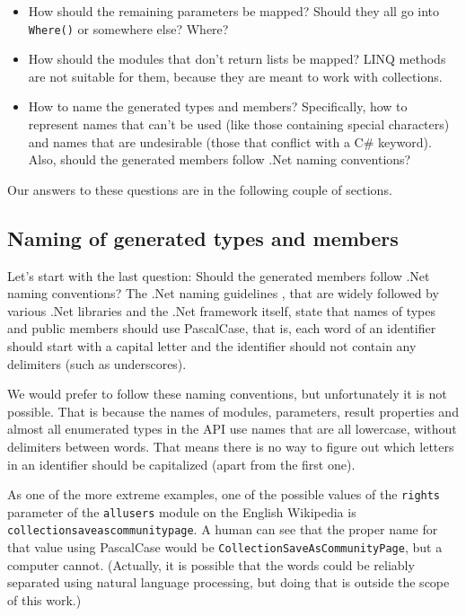 \begin{itemize}
\item How should the remaining parameters be mapped?
Should they all go into \lstinline{Where()} or somewhere else? Where?
\item How should the modules that don't return lists be mapped?
LINQ methods are not suitable for them, because they are meant to work with collections.
\item How to name the generated types and members?
Specifically, how to represent names that can't be used (like those containing special characters)
and names that are undesirable (those that conflict with a C\# keyword).
Also, should the generated members follow .Net naming conventions?
\end{itemize}

Our answers to these questions are in the following couple of sections.

\subsection{Naming of generated types and members}

Let's start with the last question: Should the generated members follow .Net naming conventions?
The .Net naming guidelines \cite{guidelines-for-names},
that are widely followed by various .Net libraries and the .Net framework itself,
state that names of types and public members should use PascalCase,
that is, each word of an identifier should start with a capital letter
and the identifier should not contain any delimiters (such as underscores).

We would prefer to follow these naming conventions, but unfortunately it is not possible.
That is because the names of modules, parameters, result properties and almost all enumerated types in the API
use names that are all lowercase, without delimiters between words.
That means there is no way to figure out which letters in an identifier should be capitalized
(apart from the first one).

As one of the more extreme examples,
one of the possible values of the \texttt{rights} parameter
of the \texttt{allusers} module on the English Wikipedia is \texttt{collection\-save\-as\-community\-page}.
A human can see that the proper name for that value using PascalCase would be \lstinline{CollectionSaveAsCommunityPage},
but a computer cannot.
(Actually, it is possible that the words could be reliably separated using natural language processing,
but doing that is outside the scope of this work.)